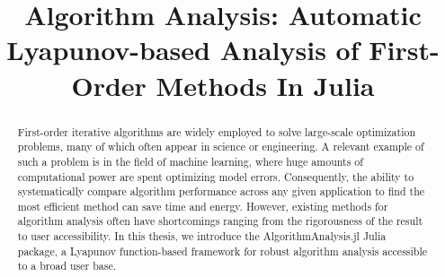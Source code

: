 \documentclass{thesis}
\title{Algorithm Analysis: Automatic Lyapunov-based Analysis of First-Order Methods In Julia}
\theoremstyle{definition}
\begin{document}
\frontmatter

\maketitle

\setcounter{page}{3}
\begin{abstract}
  First-order iterative algorithms are widely employed to solve large-scale optimization problems, many of which often appear in science or engineering. A relevant example of such a problem is in the field of machine learning, where huge amounts of computational power are spent optimizing model errors. Consequently, the ability to systematically compare algorithm performance across any given application to find the most efficient method can save time and energy. However, existing methods for algorithm analysis often have shortcomings ranging from the rigorousness of the result to user accessibility. In this thesis, we introduce the AlgorithmAnalysis.jl Julia package, a Lyapunov function-based framework for robust algorithm analysis accessible to a broad user base. 
\end{abstract}
\tableofcontents

\lof



% 

% 

\mainmatter









\appendices
% 

\backmatter


\renewcommand\bibname{References}

\end{document}
